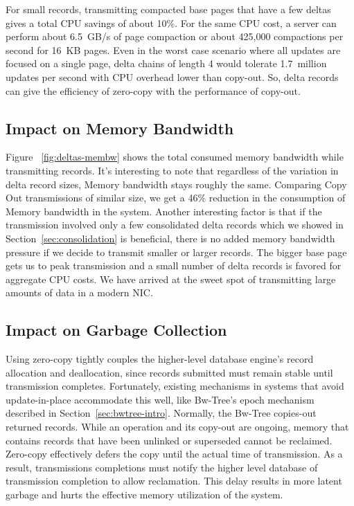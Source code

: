 For small records, transmitting compacted base pages that have a few deltas gives
a total CPU savings of about 10\%. For the same CPU cost, a server can perform
about 6.5~GB/s of page compaction or about 425,000 compactions per second for
16~KB pages. Even in the worst case scenario where all updates are focused on a
single page, delta chains of length 4 would tolerate 1.7~million updates per
second with CPU overhead lower than copy-out. So, delta records can give the
efficiency of zero-copy with the performance of copy-out.


\subsection{Impact on Memory Bandwidth}
Figure ~\ref{fig:deltas-membw} shows the total consumed memory bandwidth while 
transmitting records. It's interesting to note that regardless of the variation in 
delta record sizes, Memory bandwidth stays roughly the same. Comparing Copy Out 
transmissions of similar size, we get a 46\% reduction in the consumption of 
Memory bandwidth in the system. Another interesting factor is that if the transmission 
involved only a few consolidated delta records which we showed in Section~\ref{sec:consolidation} is 
beneficial, there is no added memory bandwidth pressure if we decide to transmit smaller 
or larger records. The bigger base page gets us to peak transmission and a small number of 
delta records is favored for aggregate CPU costs. We have arrived at the sweet spot of 
transmitting large amounts of data in a modern NIC.



\subsection{Impact on Garbage Collection}

Using zero-copy tightly couples the higher-level database engine's record
allocation and deallocation, since records submitted must remain stable until
transmission completes. Fortunately, existing mechanisms in systems that avoid
update-in-place accommodate this well, like Bw-Tree's epoch mechanism described
in Section~\ref{sec:bwtree-intro}. Normally, the Bw-Tree copies-out returned records.
While an operation and its copy-out are ongoing, memory that contains records
that have been unlinked or superseded cannot be reclaimed. Zero-copy
effectively defers the copy until the actual time of transmission. As a result,
transmissions completions must notify the higher level database of transmission
completion to allow reclamation. This delay results in more latent garbage and
hurts the effective memory utilization of the system.

